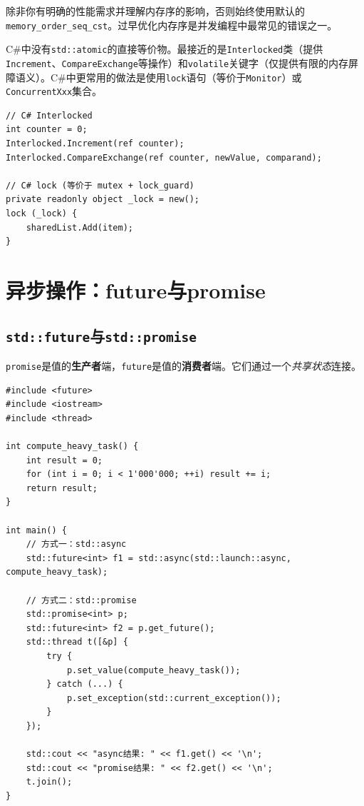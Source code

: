 \documentclass[12pt,a4paper,fontset=fandol]{ctexbook}
\newcommand{\csharp}{C\#}
\begin{document}
\begin{bestpractice}
除非你有明确的性能需求并理解内存序的影响，否则始终使用默认的\texttt{memory\_\allowbreak{}order\_\allowbreak{}seq\_\allowbreak{}cst}。过早优化内存序是并发编程中最常见的错误之一。
\end{bestpractice}

\begin{compare}
\csharp{}中没有\texttt{std::atomic}的直接等价物。最接近的是\texttt{Interlocked}类（提供\texttt{Increment}、\texttt{CompareExchange}等操作）和\texttt{volatile}关键字（仅提供有限的内存屏障语义）。\csharp{}中更常用的做法是使用\texttt{lock}语句（等价于\texttt{Monitor}）或\texttt{ConcurrentXxx}集合。

\begin{lstlisting}[style=csharpstyle]
// C# Interlocked
int counter = 0;
Interlocked.Increment(ref counter);
Interlocked.CompareExchange(ref counter, newValue, comparand);

// C# lock (等价于 mutex + lock_guard)
private readonly object _lock = new();
lock (_lock) {
    sharedList.Add(item);
}
\end{lstlisting}
\end{compare}

\chapter{异步操作：future与promise}

\section{\texttt{std::future}与\texttt{std::promise}}

\texttt{promise}是值的\textbf{生产者}端，\texttt{future}是值的\textbf{消费者}端。它们通过一个\emph{共享状态}连接。

\begin{lstlisting}
#include <future>
#include <iostream>
#include <thread>

int compute_heavy_task() {
    int result = 0;
    for (int i = 0; i < 1'000'000; ++i) result += i;
    return result;
}

int main() {
    // 方式一：std::async
    std::future<int> f1 = std::async(std::launch::async, compute_heavy_task);

    // 方式二：std::promise
    std::promise<int> p;
    std::future<int> f2 = p.get_future();
    std::thread t([&p] {
        try {
            p.set_value(compute_heavy_task());
        } catch (...) {
            p.set_exception(std::current_exception());
        }
    });

    std::cout << "async结果: " << f1.get() << '\n';
    std::cout << "promise结果: " << f2.get() << '\n';
    t.join();
}
\end{lstlisting}
\end{document}
